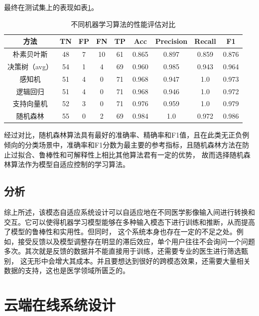 最终在测试集上的表现如表\ref{tab:ML_compare}。
\begin{table}
	\caption{\label{tab:ML_compare}不同机器学习算法的性能评估对比}
	\centering
	\small
	\begin{tabular}{c|cccccccc}
		\hline  方法 & TN & FP & FN & TP & Acc & Precision & Recall & F1 \\
		\hline 朴素贝叶斯 & 48 & 7 & 10 & 61 & 0.865 & 0.897 & 0.859 & 0.876 \\
        决策树（avg） & 54 & 1 & 4 & 69 & 0.960 & 0.985 & 0.943 & 0.964 \\
        感知机 & 51 & 4 & 0 & 71 & 0.968 & 0.947 & 1.0 & 0.973 \\
        逻辑回归 & 51 & 4 & 0 & 71 & 0.968 & 0.946 & 1.0 & 0.972 \\
		支持向量机 & 52 & 3 & 0 & 71 & 0.976 & 0.959 & 1.0 & 0.979 \\
        随机森林 & 55 & 0 & 2 & 69 & 0.984 & 1.0 & 0.972 & 0.986 \\
		\hline
		\end{tabular}
\end{table}
经过对比，随机森林算法具有最好的准确率、精确率和F1值，且在此类无正负例倾向的分类场景中，准确率和F1分数为最主要的参考指标，且随机森林方法在防止过拟合、鲁棒性和可解释性上相比其他算法君有一定的优势\cite{}，
故而选择随机森林算法作为模型自适应控制的学习算法。

\subsection{分析}
综上所述，该模态自适应系统设计可以自适应地在不同医学影像输入间进行转换和交互。它可以使得机器学习模型能够在多种输入模态下进行训练和推断，从而提高了模型的鲁棒性和实用性。但同时，
这个系统本身也存在一定的不足之处。例如，接受反馈以及模型调整存在明显的滞后效应，单个用户往往不会询问一个问题多次。其次就是反馈的数据并不能直接用于训练，还需要专业的医生进行筛选甄别，
这无形中会增大其成本。并且要想达到很好的跨模态效果，还需要大量相关数据的支持，这也是医学领域所匮乏的。

\section{云端在线系统设计}
